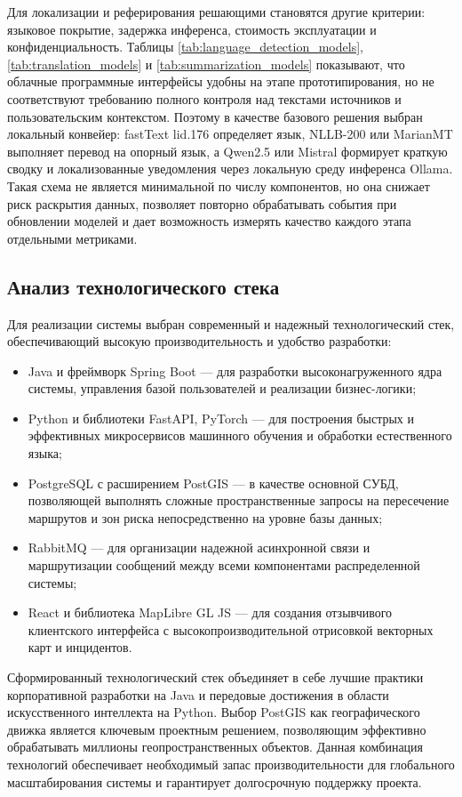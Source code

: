 Для локализации и реферирования решающими становятся другие критерии: языковое покрытие, задержка инференса, стоимость эксплуатации и конфиденциальность. Таблицы \ref{tab:language_detection_models}, \ref{tab:translation_models} и \ref{tab:summarization_models} показывают, что облачные программные интерфейсы удобны на этапе прототипирования, но не соответствуют требованию полного контроля над текстами источников и пользовательским контекстом. Поэтому в качестве базового решения выбран локальный конвейер: fastText lid.176 определяет язык, NLLB-200 или MarianMT выполняет перевод на опорный язык, а Qwen2.5 или Mistral формирует краткую сводку и локализованные уведомления через локальную среду инференса Ollama\cite{ollama_bib}. Такая схема не является минимальной по числу компонентов, но она снижает риск раскрытия данных, позволяет повторно обрабатывать события при обновлении моделей и дает возможность измерять качество каждого этапа отдельными метриками.

\subsection{Анализ технологического стека}

Для реализации системы выбран современный и надежный технологический стек, обеспечивающий высокую производительность и удобство разработки:
\begin{itemize}
\item Java и фреймворк Spring Boot — для разработки высоконагруженного ядра системы, управления базой пользователей и реализации бизнес-логики\cite{java_bib,spring_docs_bib,springboot_bib};
\item Python и библиотеки FastAPI, PyTorch — для построения быстрых и эффективных микросервисов машинного обучения и обработки естественного языка\cite{python_bib,python_docs_bib,fastapi_bib,pytorch_bib};
\item PostgreSQL с расширением PostGIS — в качестве основной СУБД, позволяющей выполнять сложные пространственные запросы на пересечение маршрутов и зон риска непосредственно на уровне базы данных\cite{postgresql_bib,postgis_bib};
\item RabbitMQ — для организации надежной асинхронной связи и маршрутизации сообщений между всеми компонентами распределенной системы\cite{rabbitmq_bib,rabbitmq_docs_bib};
\item React и библиотека MapLibre GL JS — для создания отзывчивого клиентского интерфейса с высокопроизводительной отрисовкой векторных карт и инцидентов\cite{react_bib,react_docs_bib,maplibre_bib,maplibre_docs_bib}.
\end{itemize}
Сформированный технологический стек объединяет в себе лучшие практики корпоративной разработки на Java и передовые достижения в области искусственного интеллекта на Python. Выбор PostGIS как географического движка является ключевым проектным решением, позволяющим эффективно обрабатывать миллионы геопространственных объектов. Данная комбинация технологий обеспечивает необходимый запас производительности для глобального масштабирования системы и гарантирует долгосрочную поддержку проекта.


